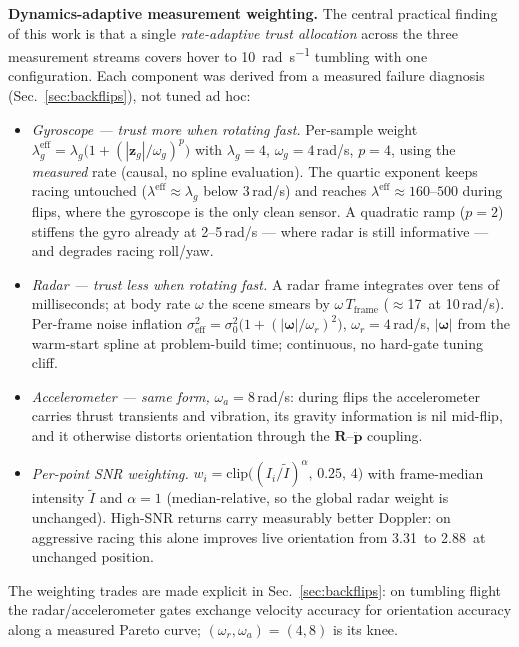 \documentclass[conference]{IEEEtran}
\newcommand{\vR}{\mathbf{R}}
\newcommand{\vp}{\mathbf{p}}
\newcommand{\vom}{\boldsymbol{\omega}}
\newcommand{\vz}{\mathbf{z}}
\begin{document}
\textbf{Dynamics-adaptive measurement weighting.}
The central practical finding of this work is that a single
\emph{rate-adaptive trust allocation} across the three measurement
streams covers hover to \SI{10}{\radian\per\second} tumbling with one
configuration.  Each component was derived from a measured failure
diagnosis (Sec.~\ref{sec:backflips}), not tuned ad hoc:
\begin{itemize}
\item \emph{Gyroscope --- trust more when rotating fast.}
  Per-sample weight
  $\lambda_g^{\mathrm{eff}} = \lambda_g\bigl(1 + (|\vz_g|/\omega_g)^p\bigr)$
  with $\lambda_g{=}4$, $\omega_g{=}4$\,rad/s, $p{=}4$, using the
  \emph{measured} rate (causal, no spline evaluation).  The quartic
  exponent keeps racing untouched ($\lambda^{\mathrm{eff}}\!\approx\!\lambda_g$
  below 3\,rad/s) and reaches $\lambda^{\mathrm{eff}}\!\approx\!160$--$500$
  during flips, where the gyroscope is the only clean sensor.  A
  quadratic ramp ($p{=}2$) stiffens the gyro already at 2--5\,rad/s ---
  where radar is still informative --- and degrades racing roll/yaw.
\item \emph{Radar --- trust less when rotating fast.}
  A radar frame integrates over tens of milliseconds; at body rate
  $\omega$ the scene smears by $\omega\,T_{\mathrm{frame}}$
  ($\approx$17\degree\ at 10\,rad/s).  Per-frame noise inflation
  $\sigma_{\mathrm{eff}}^2 = \sigma_0^2\bigl(1+(|\vom|/\omega_r)^2\bigr)$,
  $\omega_r{=}4$\,rad/s, $|\vom|$ from the warm-start spline at
  problem-build time; continuous, no hard-gate tuning cliff.
\item \emph{Accelerometer --- same form,} $\omega_a{=}8$\,rad/s:
  during flips the accelerometer carries thrust transients and
  vibration, its gravity information is nil mid-flip, and it otherwise
  distorts orientation through the $\vR$--$\ddot{\vp}$ coupling.
\item \emph{Per-point SNR weighting.}
  $w_i = \mathrm{clip}\bigl((I_i/\tilde{I})^{\alpha},\,0.25,\,4\bigr)$
  with frame-median intensity $\tilde I$ and $\alpha{=}1$
  (median-relative, so the global radar weight is unchanged).  High-SNR
  returns carry measurably better Doppler: on aggressive racing this
  alone improves live orientation from 3.31\degree\ to 2.88\degree\ at
  unchanged position.
\end{itemize}
The weighting trades are made explicit in
Sec.~\ref{sec:backflips}: on tumbling flight the radar/accelerometer
gates exchange velocity accuracy for orientation accuracy along a
measured Pareto curve; $(\omega_r,\omega_a){=}(4,8)$ is its knee.
\end{document}
